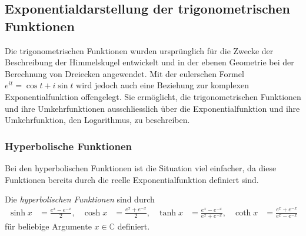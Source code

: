 %
%
\subsection{Exponentialdarstellung der trigonometrischen Funktionen
\label{buch:intalg:elementar:subsection:trigo}}
Die trigonometrischen Funktionen wurden ursprünglich für die Zwecke
der Beschreibung der Himmelskugel entwickelt und in der ebenen
Geometrie bei der Berechnung von Dreiecken angewendet.
Mit der eulerschen Formel $e^{it}=\cos t + i\sin t$ wird jedoch 
%
auch eine Beziehung zur komplexen Exponentialfunktion offengelegt.
Sie ermöglicht, die trigonometrischen Funktionen und ihre
Umkehrfunktionen ausschliesslich über die Exponentialfunktion und
ihre Umkehrfunktion, den Logarithmus, zu beschreiben.

%
%
\subsubsection{Hyperbolische Funktionen}
Bei den hyperbolischen Funktionen ist die Situation viel einfacher,
da diese Funktionen bereits durch die reelle Exponentialfunktion
definiert sind.

\begin{definition}
\label{buch:intalg:elementar:trigo:def:hyperbolisch}
Die \emph{hyperbolischen Funktionen} sind durch
%
\begin{align*}
\sinh x &= \frac{e^x-e^{-x}}2,
&
\cosh x &= \frac{e^x+e^{-x}}2,
&
\tanh x &= \frac{e^x-e^{-x}}{e^x+e^{-x}},
&
\coth x &= \frac{e^x+e^{-x}}{e^x-e^{-x}}
\end{align*}
für beliebige Argumente $x\in \mathbb{C}$ definiert.
%
%
%
%
\end{definition}

